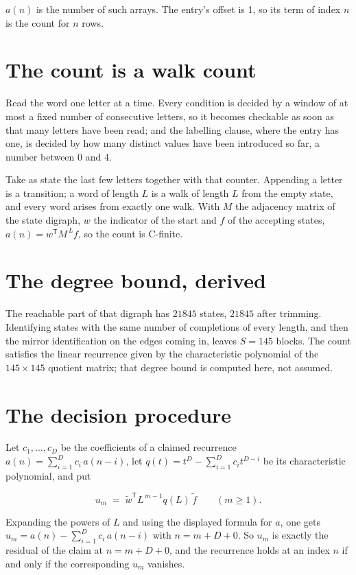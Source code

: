 \documentclass[11pt]{article}
\theoremstyle{definition}
\begin{document}
$a(n)$ is the number of such arrays. The entry's offset is 1, so its term of index $n$ is the count for $n$ rows.

\section{The count is a walk count}

Read the word one letter at a time. Every condition is decided by a window of at most a fixed number of consecutive letters, so it becomes checkable as soon as that many letters have been read; and the labelling clause, where the entry has one, is decided by how many distinct values have been introduced so far, a number between $0$ and 4.

Take as state the last few letters together with that counter. Appending a letter is a transition; a word of length $L$ is a walk of length $L$ from the empty state, and every word arises from exactly one walk. With $M$ the adjacency matrix of the state digraph, $w$ the indicator of the start and $f$ of the accepting states, $a(n) = w^{\mathsf T}M^{\,L}f$, so the count is C-finite.

\section{The degree bound, derived}

The reachable part of that digraph has $21845$ states, $21845$ after trimming. Identifying states with the same number of completions of every length, and then the mirror identification on the edges coming in, leaves $S = 145$ blocks. The count satisfies the linear recurrence given by the characteristic polynomial of the $145\times145$ quotient matrix; that degree bound is computed here, not assumed.

\section{The decision procedure}

Let $c_1,\dots,c_D$ be the coefficients of a claimed recurrence $a(n) = \sum_{i=1}^{D} c_i\,a(n-i)$, let $q(t) = t^{D} - \sum_{i=1}^{D} c_i t^{D-i}$ be its characteristic polynomial, and put

\[u_m \;=\; \tilde w^{\mathsf T} L^{\,m-1} q(L)\,\tilde f \qquad (m \ge 1).\]

Expanding the powers of $L$ and using the displayed formula for $a$, one gets $u_m = a(n) - \sum_{i=1}^{D} c_i\,a(n-i)$ with $n = m + D + 0$. So $u_m$ is exactly the residual of the claim at $n = m + D + 0$, and the recurrence holds at an index $n$ if and only if the corresponding $u_m$ vanishes.
\end{document}
